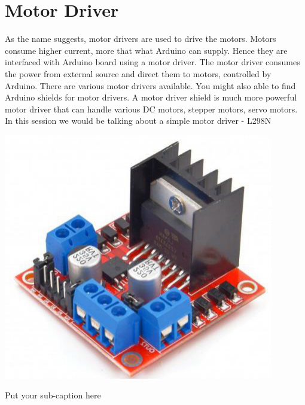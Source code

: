 \chapter{Motor Driver}
\label{chap:Motor_Driver}

\par As the name suggests, motor drivers are used to drive the motors. Motors consume higher current, more that what Arduino can supply. Hence they are interfaced with Arduino board using a motor driver. The motor driver consumes the power from external source and direct them to motors, controlled by Arduino. There are various motor drivers available. You might also able to find Arduino shields for motor drivers. A motor driver shield is much more powerful motor driver that can handle various DC motors, stepper motors, servo motors. In this session we would be talking about a simple motor driver - L298N

\begin{marginfigure}
\centering
  \includegraphics[width=.8\linewidth]{Chapters/images/MotorDriver_board.png}  
  \caption{Put your sub-caption here}
  
\end{marginfigure}

